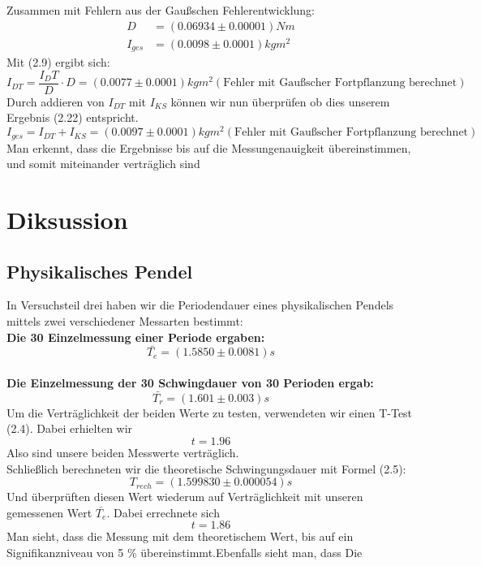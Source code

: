\documentclass[11pt,a4paper]{article}
\begin{document}
	Zusammen mit Fehlern aus der Gaußschen Fehlerentwicklung:
	\begin{align}
	D&=(0.06934 \pm 0.00001) Nm \\
	I_{ges}&=(0.0098 \pm 0.0001)kgm^2
	\end{align}
	Mit (2.9) ergibt sich:
	\begin{equation}
	I_{DT}=\frac{I_DT}{D} \cdot D =(0.0077 \pm 0.0001)kgm^2 (\text{Fehler mit Gaußscher Fortpflanzung berechnet})
	\end{equation}
	\vspace{0.5 ex}Durch addieren von $I_{DT}$ mit $I_{KS}$ können wir nun überprüfen ob dies unserem Ergebnis (2.22)
	entspricht.
	\begin{equation}
	I_{ges}=I_{DT}+I_{KS}=(0.0097 \pm 0.0001)kgm^2 (\text{Fehler mit Gaußscher Fortpflanzung berechnet})
	\end{equation}
	Man erkennt, dass die Ergebnisse bis auf die Messungenauigkeit übereinstimmen, und somit miteinander verträglich sind
\newpage

\section{Diksussion}

	\subsection{Physikalisches Pendel}
	In Versuchsteil drei haben wir die Periodendauer eines physikalischen Pendels mittels
	zwei verschiedener Messarten bestimmt:\\
	{\bf Die 30 Einzelmessung einer Periode ergaben:}$$\bar{T_e}=(1.5850 \pm 0.0081)s$$\\
	{\bf Die Einzelmessung der 30 Schwingdauer von 30 Perioden ergab:} $$\bar{T_r}=(1.601\pm 0.003)s$$
	Um die Verträglichkeit der beiden Werte zu testen, verwendeten wir einen T-Test (2.4). Dabei erhielten wir $$t=1.96$$ Also sind unsere beiden Messwerte verträglich.
	\\ Schließlich berechneten wir die theoretische Schwingungsdauer mit Formel (2.5):
	$$T_{rech}=(1.599830\pm 0.000054)s$$
	Und überprüften diesen Wert wiederum auf Verträglichkeit mit unseren gemessenen Wert $\bar{T_e}$.
	Dabei errechnete sich
	$$t=1.86$$
	Man sieht, dass die Messung mit dem theoretischem Wert, bis auf ein Signifikanzniveau von 5 \% übereinstimmt.Ebenfalls sieht man, dass Die
\end{document}
